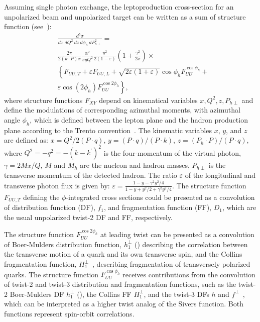 \documentclass[aps,prl,twocolumn,showpacs,superscriptaddress,groupedaddress]{revtex4}  %
\newcommand{\zh}{z}
\newcommand{\xbj}{x}
\newcommand{\ph}{\phi_h}
\begin{document}
Assuming single photon exchange, the leptoproduction cross-section for an unpolarized beam and unpolarized target can be written as a sum of structure function (see~\cite{Bacchetta:2006tn}):
\begin{equation}
\label{eq:crosssection3}
\begin{split}
& \frac{d^{5} \sigma}{dx\ dQ^2\ dz\ d \phi_{h}\ dP_{h \perp}^{2}} =
\\
& \frac{2\pi}{2(k\cdot P)x} \frac{\alpha^{2}}{xyQ^{2}} \frac{y^{2}}{2 \left( 1 - \varepsilon \right)} \left( 1 + \frac{\gamma^{2}}{2x} \right) \times
\\
& \left\{ F_{UU,T} + \varepsilon F_{UU,L} + \sqrt{2 \varepsilon \left( 1 + \varepsilon \right)} \cos \phi_{h} F^{\cos \phi_{h}}_{UU} + \right.
\\
& \left. \varepsilon \cos \left( 2 \phi_{h} \right) F_{UU}^{\cos2\phi_{h}} \right\},
\end{split}
\end{equation}
where structure functions $F_{XY}$ depend on kinematical variables $x,Q^2,z,P_{h\perp}$ and define the modulations of corresponding azimuthal moments, with azimuthal angle $\phi_{h}$, which is defined between the lepton plane and the hadron production plane according to the Trento convention~\cite{Bacchetta:2004jz}.
The kinematic variables $\xbj$, $y$, and $z$  are defined as: 
$\xbj = Q^2/{2(P\cdot q)}$, $y={(P \cdot q)/(P \cdot k)}$, $\zh=(P_h \cdot P)/(P \cdot q)$, 
where $Q^2=-q^2=-(k-k^\prime)^2$ is the four-momentum 
of the virtual photon,  $\gamma=2M\xbj /Q$,
 $M$ and $M_h$ are the nucleon and hadron masses, $P_{h\perp}$ is the transverse momentum of the 
detected hadron.  The ratio $\varepsilon$ of the longitudinal and transverse photon flux is given by: $\varepsilon=\frac{1-y-\gamma^2y^2/4}{1-y+y^2/2+\gamma^2y^2/4}$.
The structure function  $F_{UU,T}$  defining the $\phi$-integrated cross sections could be presented as a convolution of  distribution function (DF), $f_1$,   and fragmentation function (FF), $D_1$, which  are the usual unpolarized twist-2 DF and FF, respectively. 

The structure function $F^{\cos 2\ph}_{UU}$ at leading twist can be presented as a convolution of Boer-Mulders distribution function, $h_1^\perp$ (\cite{Boer:1997nt}) describing the correlation between the transverse motion
of a quark and its own transverse spin, and  the Collins fragmentation function, $H_1^{\perp}$~\cite{Collins:1992kk}, describing fragmentation of transversely polarized quarks.
The structure function $F^{\cos \ph}_{UU}$  receives contributions 
from the convolution of twist-2 and twist-3 distribution and fragmentation functions,
such as the twist-2 Boer-Mulders DF $h_1^\perp$ (\cite{Boer:1997nt,Pasquini:2010af}), the Collins FF $H_1^{\perp}$, and the twist-3 DFs $h$ and $f^\perp$~\cite{Bacchetta:2006tn}, which can be interpreted as a higher twist analog of the Sivers function. Both functions represent spin-orbit correlations. 
\end{document}
